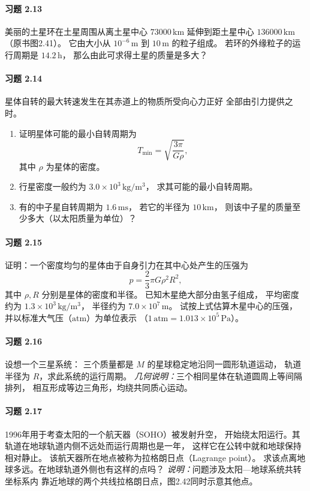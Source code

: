 \paragraph{习题 2.13}
美丽的土星环在土星周围从离土星中心
\(73000\,\mathrm{km}\) 延伸到距土星中心
\(136000\,\mathrm{km}\)（原书图2.41）。
它由大小从 \(10^{-6}\,\mathrm m\) 到
\(10\,\mathrm m\) 的粒子组成。
若环的外缘粒子的运行周期是 \(14.2\,\mathrm h\)，
那么由此可求得土星的质量是多大？

\paragraph{习题 2.14}
星体自转的最大转速发生在其赤道上的物质所受向心力正好
全部由引力提供之时。
\begin{enumerate}
\item 证明星体可能的最小自转周期为
\[
 T_{\min}=\sqrt{\frac{3\pi}{G\rho}},
\]
其中 \(\rho\) 为星体的密度。
\item 行星密度一般约为
\(3.0\times10^3\,\mathrm{kg/m^3}\)，
求其可能的最小自转周期。
\item 有的中子星自转周期为 \(1.6\,\mathrm{ms}\)，
若它的半径为 \(10\,\mathrm{km}\)，
则该中子星的质量至少多大（以太阳质量为单位）？
\end{enumerate}

\paragraph{习题 2.15}
证明：一个密度均匀的星体由于自身引力在其中心处产生的压强为
\[
 p=\frac23\pi G\rho^2R^2,
\]
其中 \(\rho,R\) 分别是星体的密度和半径。
已知木星绝大部分由氢子组成，
平均密度约为
\(1.3\times10^3\,\mathrm{kg/m^3}\)，
半径约为 \(7.0\times10^7\,\mathrm m\)。
试按上式估算木星中心的压强，
并以标准大气压（\(\mathrm{atm}\)）为单位表示
（\(1\,\mathrm{atm}=1.013\times10^5\,\mathrm{Pa}\)）。

\paragraph{习题 2.16}
设想一个三星系统：
三个质量都是 \(M\) 的星球稳定地沿同一圆形轨道运动，
轨道半径为 \(R\)，求此系统的运行周期。
\textit{几何说明：}三个相同星体在轨道圆周上等间隔排列，
相互形成等边三角形，均绕共同质心运动。

\paragraph{习题 2.17}
1996年用于考查太阳的一个航天器（SOHO）被发射升空，
开始绕太阳运行。其轨道在地球轨道内侧不远处而运行周期也是一年，
这样它在公转中就和地球保持相对静止。
该航天器所在地点被称为拉格朗日点（Lagrange point）。
求该点离地球多远。在地球轨道外侧也有这样的点吗？
\textit{说明：}问题涉及太阳—地球系统共转坐标系内
靠近地球的两个共线拉格朗日点，图2.42同时示意其他点。

